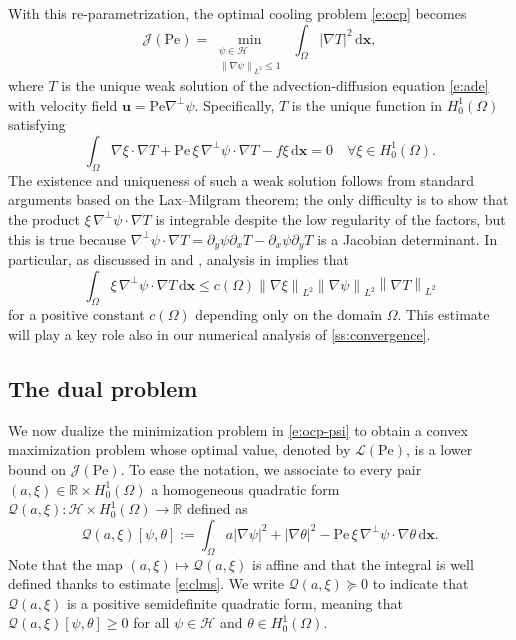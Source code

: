 \documentclass[a4paper, 10pt]{amsart}
\numberwithin{equation}{section}
\theoremstyle{plain}
\theoremstyle{definition}
\theoremstyle{remark}
\newcommand{\cal}[1]{\mathcal{#1}}
\newcommand{\R}{\mathbb{R}}
\newcommand{\Pe}{\mathrm{Pe}}
\renewcommand{\vec}[1]{\mathbf{#1}}
\newcommand{\abs}[1]{\left\vert #1 \right\vert}
\newcommand{\dx}{\mathrm{d} \vec{x}}
\newcommand{\avg}[1]{\int_\Omega #1 \,\dx}
\newcommand{\norm}[1]{\left\| #1 \right\|}
\newcommand{\ocpval}{\mathcal{J}}
\newcommand{\lb}{\mathcal{L}}
\begin{document}
With this re-parametrization, the optimal cooling problem \cref{e:ocp} becomes
\begin{equation}\label{e:ocp-psi}
    \ocpval(\Pe)=
    \min_{\substack{
        \psi \in \cal{H} \\ 
        \norm{\nabla \psi}_{L^2} \leq 1
    }}\;
    \avg{\abs{\nabla T}^2},
\end{equation}
where $T$ is the unique weak solution of the advection-diffusion equation \cref{e:ade} with velocity field $\vec{u}=\Pe \nabla^\perp \psi$. Specifically, $T$ is the unique function in $H^1_0(\Omega)$ satisfying
\begin{equation}\label{e:ade-weak}
    \avg{ \nabla \xi \cdot \nabla T + \Pe\,\xi \,\nabla^\perp \psi \cdot \nabla T - f\xi}= 0 \quad \forall \xi \in H^1_0(\Omega).
\end{equation}
The existence and uniqueness of such a weak solution follows from standard arguments based on the Lax--Milgram theorem; the only difficulty is to show that the product $\xi \,\nabla^\perp \psi \cdot \nabla T$ is integrable despite the low regularity of the factors, but this is true because $\nabla^\perp \psi \cdot \nabla T = \partial_y\psi \partial_x T - \partial_x \psi \partial_y T$ is a Jacobian determinant. In particular, as discussed in  \cite[Remark~2.2]{Tobasco2022} and \cite[\S3.1]{Song2023}, analysis in \cite{Coifman1990} implies that
\begin{equation}\label{e:clms}
    \avg{ \xi \,\nabla^\perp \psi \cdot \nabla T } \leq c(\Omega) \norm{\nabla \xi}_{L^2} \norm{\nabla \psi}_{L^2} \norm{\nabla T}_{L^2}
\end{equation}
for a positive constant $c(\Omega)$ depending only on the domain $\Omega$.
This estimate will play a key role also in our numerical analysis of \cref{ss:convergence}. 


\subsection{The dual problem}\label{ss:dualization}
We now dualize the minimization problem in \cref{e:ocp-psi} to obtain a convex maximization problem whose optimal value, denoted by $\lb(\Pe)$, is a lower bound on $\ocpval(\Pe)$.  To ease the notation, we associate to every pair $(a,\xi) \in \R \times H^1_0(\Omega)$ a homogeneous quadratic form $\mathcal{Q}(a,\xi):\cal{H} \times H^1_0(\Omega) \to \R$ defined as
\begin{equation}\label{e:qf}
    \mathcal{Q}\left(a,\xi\right)[\psi,\theta] := \avg{ a|\nabla \psi|^2 + \abs{\nabla\theta}^2 - \Pe\,\xi\, \nabla^\perp \psi \cdot \nabla \theta}.
\end{equation}
Note that the map $(a,\xi) \mapsto \mathcal{Q}(a,\xi)$ is affine and that the integral is well defined thanks to estimate \cref{e:clms}. We write $\mathcal{Q}\left(a,\xi\right)\succeq 0$ to indicate that $\mathcal{Q}\left(a,\xi\right)$ is a positive semidefinite quadratic form, meaning that $\mathcal{Q}\left(a,\xi\right)[\psi,\theta] \geq 0$ for all $\psi \in \cal{H}$ and $\theta \in H^1_0(\Omega)$.
\end{document}
